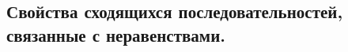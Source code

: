 \documentclass[14pt, oneside]{extbook}
\begin{document}
\subsection{Свойства сходящихся последовательностей, связанные с неравенствами.}

%
%
\end{document}
